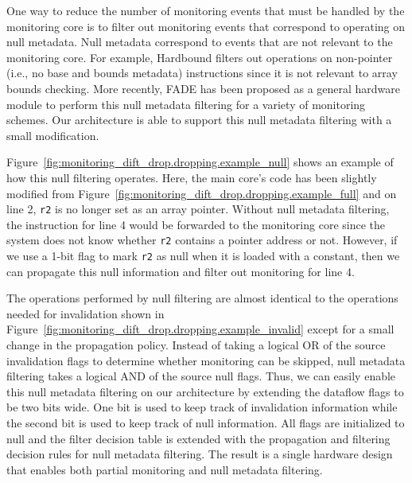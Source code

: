 One way to reduce the number of monitoring events that must be handled by the
monitoring core is to filter out monitoring events that correspond to operating on null
metadata. Null metadata correspond to events that are not relevant to the
monitoring core. For example, Hardbound \cite{hardbound-asplos08} filters out
operations on non-pointer (i.e., no base and bounds metadata) instructions
since it is not relevant to array bounds checking. More recently, FADE
\cite{fade-hpca14} has been proposed as a general hardware module to perform
this null metadata filtering for a variety of monitoring schemes. Our
architecture is able to support this null metadata filtering with a small
modification.

Figure~\ref{fig:monitoring_dift_drop.dropping.example_null} shows an example of
how this null filtering operates.  Here, the main core's code has been slightly
modified from Figure~\ref{fig:monitoring_dift_drop.dropping.example_full} and
on line 2, {\tt r2} is no longer set as an array pointer.  Without null
metadata filtering, the instruction for line 4 would be forwarded to the
monitoring core since the system does not know whether {\tt r2} contains a pointer
address or not. However, if we use a 1-bit flag to mark {\tt r2} as null when
it is loaded with a constant, then we can propagate this null information and
filter out monitoring for line 4.

The operations performed by null filtering are almost identical to the
operations needed for invalidation shown in
Figure~\ref{fig:monitoring_dift_drop.dropping.example_invalid} except for a
small change in the propagation policy. Instead of taking a logical OR of the
source invalidation flags to determine whether monitoring can be skipped, null
metadata filtering takes a logical AND of the source null flags.  Thus, we can
easily enable this null metadata filtering on our architecture by extending the
dataflow flags to be two bits wide. One bit is used to keep track of
invalidation information while the second bit is used to keep track of null
information. All flags are initialized to null and the filter decision table is
extended with the propagation and filtering decision rules for null metadata
filtering.  The result is a single hardware design that enables both partial
monitoring and null metadata filtering.

